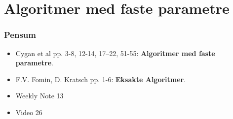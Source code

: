 \section{Algoritmer med faste parametre}%
\label{sec:algoparametre}

\begin{frame}
  \frametitle{Pensum}
  \begin{itemize}
    \item Cygan et al pp. 3-8, 12-14, 17--22, 51-55: \textbf{Algoritmer med faste parametre}.
    \item F.V. Fomin, D. Kratsch pp. 1-6: \textbf{Eksakte Algoritmer}.
    \item Weekly Note 13
    \item Video 26
  \end{itemize}
\end{frame}



